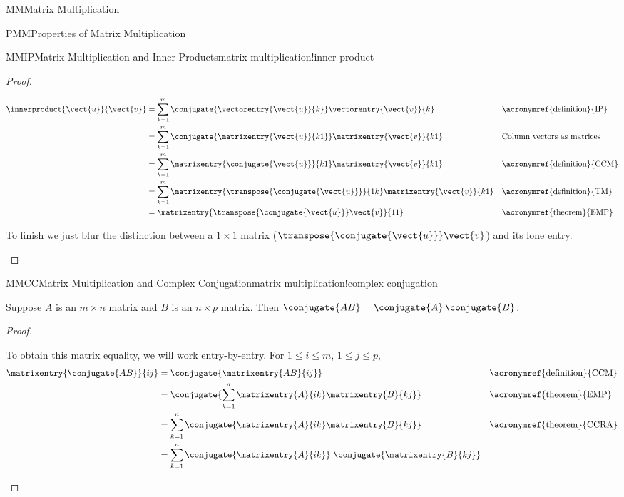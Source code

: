 \begin{subsect}{MM}{Matrix Multiplication}
\begin{subsect}{PMM}{Properties of Matrix Multiplication}
\begin{theorem}{MMIP}{Matrix Multiplication and Inner Products}{matrix multiplication!inner product}
%
\end{theorem}
%
\begin{proof}
%
\begin{para}
\begin{align*}
\innerproduct{\vect{u}}{\vect{v}}
%
&=\sum_{k=1}^{m}\conjugate{\vectorentry{\vect{u}}{k}}\vectorentry{\vect{v}}{k}
&&\text{\acronymref{definition}{IP}}\\
%
&=\sum_{k=1}^{m}\conjugate{\matrixentry{\vect{u}}{k1}}\matrixentry{\vect{v}}{k1}
&&\text{Column vectors as matrices}\\
%
&=\sum_{k=1}^{m}\matrixentry{\conjugate{\vect{u}}}{k1}\matrixentry{\vect{v}}{k1}
&&\text{\acronymref{definition}{CCM}}\\
%
&=\sum_{k=1}^{m}\matrixentry{\transpose{\conjugate{\vect{u}}}}{1k}\matrixentry{\vect{v}}{k1}
&&\text{\acronymref{definition}{TM}}\\
%
&=\matrixentry{\transpose{\conjugate{\vect{u}}}\vect{v}}{11}
&&\text{\acronymref{theorem}{EMP}}\\
\end{align*}
\end{para}
%
\begin{para}To finish we just blur the distinction between a $1\times 1$ matrix ($\transpose{\conjugate{\vect{u}}}\vect{v}$) and its lone entry.\end{para}
%
\end{proof}
%
\begin{theorem}{MMCC}{Matrix Multiplication and Complex Conjugation}{matrix multiplication!complex conjugation}
\begin{para}Suppose $A$ is an $m\times n$ matrix and $B$ is an $n\times p$ matrix.  Then $\conjugate{AB}=\conjugate{A}\,\conjugate{B}$.\end{para}
\end{theorem}
%
\begin{proof}
%
\begin{para}To obtain this matrix equality, we will work entry-by-entry.  For $1\leq i\leq m$, $1\leq j\leq p$,
%
\begin{align*}
\matrixentry{\conjugate{AB}}{ij}
%
&=\conjugate{\matrixentry{AB}{ij}}
&&\text{\acronymref{definition}{CCM}}\\
%
&=\conjugate{\sum_{k=1}^{n}\matrixentry{A}{ik}\matrixentry{B}{kj}}
&&\text{\acronymref{theorem}{EMP}}\\
%
&=\sum_{k=1}^{n}\conjugate{\matrixentry{A}{ik}\matrixentry{B}{kj}}
&&\text{\acronymref{theorem}{CCRA}}\\
%
&=\sum_{k=1}^{n}\conjugate{\matrixentry{A}{ik}}\,\,\conjugate{\matrixentry{B}{kj}}

\end{align*}
\end{para}
\end{proof}
\end{subsect}
\end{subsect}

